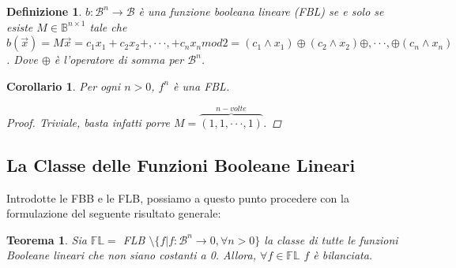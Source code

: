 \documentclass[12pt,a4paper,openright]{report}
\newcommand*\xor{\mathbin{\oplus}}
\newtheorem{mydef}{Definizione}[chapter]
\newtheorem*{mycor}{Corollario}
\newtheorem{mythm}{Teorema}[chapter]
\begin{document}
\begin{mydef}
$b:\mathcal{B}^n \rightarrow \mathcal{B}$ è una funzione booleana lineare (FBL) se e solo se esiste $M \in \mathbb{B}^{n \times 1}$ tale che $b(\vec{x})=M\vec{x}=c_1x_1+c_2x_2+,\cdot\cdot\cdot,+c_nx_n mod 2=(c_1\land{x_1})\xor(c_2\land{x_2})\xor,\cdot\cdot\cdot,\xor(c_n\land{x_n})$. Dove $\xor$
è l'operatore di somma per $\mathcal{B}^n$. 
\end{mydef}
\begin{mycor}
    Per ogni $n>0$, $f^n$ è una FBL.
    \begin{proof}
        Triviale, basta infatti porre $M=\overbrace{(1,1,\cdot\cdot\cdot,1)}^{n-volte}$.
    \end{proof}
\end{mycor}

\subsection{La Classe delle Funzioni Booleane Lineari}
Introdotte le FBB e le FLB, possiamo a questo punto procedere con la formulazione del seguente risultato generale:
\begin{mythm}
    Sia $\mathbb{FL}=$ FLB $\setminus \{f| f: \mathcal{B}^n \rightarrow {0}, \forall n>0 \} $ la classe di tutte le funzioni Booleane lineari
    che non siano costanti a 0. Allora, $\forall f\in \mathbb{FL}$ $f$ è bilanciata.
\end{mythm}
\end{document}
